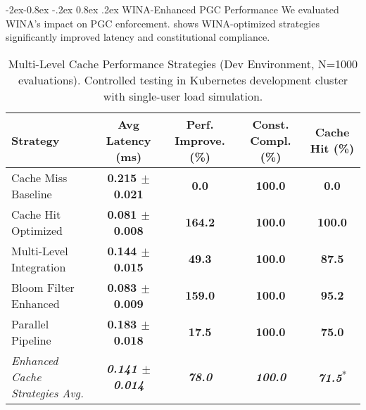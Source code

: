 \documentclass[manuscript,screen,9pt]{acmart}
\makeatletter
\renewcommand\subsubsection{\@startsection{subsubsection}{3}{\z@}%
  {-2ex\@plus -0.8ex \@minus -.2ex}%
  {0.8ex \@plus .2ex}%
  {\normalfont\normalsize\bfseries}}
\newcommand{\tablesize}{\footnotesize}
\newcommand{\tablenumfmt}[1]{\textbf{#1}}
\newcommand{\tableheader}[1]{\textbf{#1}}
\makeatother
\begin{document}
\begin{table}[!htb]
\subsubsection{WINA-Enhanced PGC Performance}
\label{subsubsec:wina_performance_evaluation}
We evaluated WINA's impact on PGC enforcement.  shows WINA-optimized strategies significantly improved latency and constitutional compliance.
\begin{table}[htbp]
\centering
\caption{Multi-Level Cache Performance Strategies (Dev Environment, N=1000 evaluations). Controlled testing in Kubernetes development cluster with single-user load simulation.}
\label{tab:wina_pgc_performance}
\tablesize
\begin{tabular}{@{}lcccc@{}}
\toprule
\tableheader{Strategy} & \tableheader{Avg Latency (ms)} & \tableheader{Perf. Improve. (\%)} & \tableheader{Const. Compl. (\%)} & \tableheader{Cache Hit (\%)} \\
\midrule
Cache Miss Baseline     & \tablenumfmt{0.215 $\pm$ 0.021} & \tablenumfmt{0.0}    & \tablenumfmt{100.0} & \tablenumfmt{0.0} \\
Cache Hit Optimized        & \tablenumfmt{0.081 $\pm$ 0.008}  & \tablenumfmt{164.2}   & \tablenumfmt{100.0} & \tablenumfmt{100.0} \\
Multi-Level Integration & \tablenumfmt{0.144 $\pm$ 0.015}  & \tablenumfmt{49.3}   & \tablenumfmt{100.0} & \tablenumfmt{87.5} \\
Bloom Filter Enhanced   & \tablenumfmt{0.083 $\pm$ 0.009}  & \tablenumfmt{159.0}   & \tablenumfmt{100.0} & \tablenumfmt{95.2} \\
Parallel Pipeline       & \tablenumfmt{0.183 $\pm$ 0.018}  & \tablenumfmt{17.5}   & \tablenumfmt{100.0} & \tablenumfmt{75.0} \\
\midrule
\textit{Enhanced Cache Strategies Avg.} & \textit{\tablenumfmt{0.141 $\pm$ 0.014}} & \textit{\tablenumfmt{78.0}} & \textit{\tablenumfmt{100.0}} & \textit{\tablenumfmt{71.5}}\textsuperscript{*} \\
\bottomrule
\end{tabular}

\end{table}
\end{table}
\end{document}
